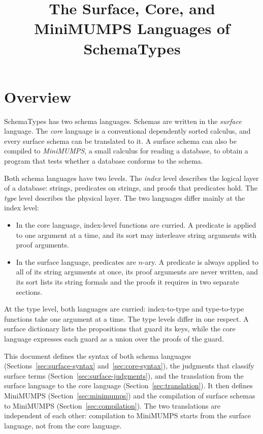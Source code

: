 \documentclass[11pt]{article}
\title{The Surface, Core, and MiniMUMPS Languages of SchemaTypes}
\date{}
\theoremstyle{remark}
\begin{document}
\maketitle

\section{Overview}

SchemaTypes has two schema languages. Schemas are written in the \emph{surface} language. The
\emph{core} language is a conventional dependently sorted calculus, and every surface schema can be
translated to it. A surface schema can also be compiled to \emph{MiniMUMPS}, a small calculus for
reading a database, to obtain a program that tests whether a database conforms to the schema.

Both schema languages have two levels. The \emph{index} level describes the logical layer of a database:
strings, predicates on strings, and proofs that predicates hold. The \emph{type} level describes
the physical layer. The two languages differ mainly at the index level:
\begin{itemize}
\item In the core language, index-level functions are curried. A predicate is applied to one argument
  at a time, and its sort may interleave string arguments with proof arguments.
\item In the surface language, predicates are $n$-ary. A predicate is always applied to all of its
  string arguments at once, its proof arguments are never written, and its sort lists its string
  formals and the proofs it requires in two separate sections.
\end{itemize}
At the type level, both languages are curried: index-to-type and type-to-type functions take one
argument at a time. The type levels differ in one respect. A surface dictionary lists the
propositions that guard its keys, while the core language expresses each guard as a union over the
proofs of the guard.

This document defines the syntax of both schema languages (Sections~\ref{sec:surface-syntax}
and~\ref{sec:core-syntax}), the judgments that classify surface terms
(Section~\ref{sec:surface-judgments}), and the translation from the surface language to the core
language (Section~\ref{sec:translation}). It then defines MiniMUMPS
(Section~\ref{sec:minimumps}) and the compilation of surface schemas to MiniMUMPS
(Section~\ref{sec:compilation}). The two translations are independent of each other: compilation to
MiniMUMPS starts from the surface language, not from the core language.
\end{document}
